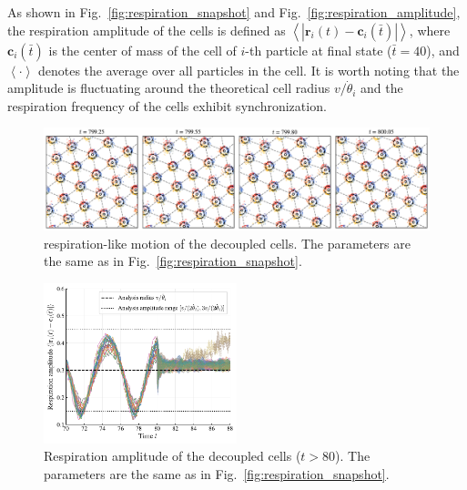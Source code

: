 \documentclass{article}
\begin{document}
As shown in Fig.~\ref{fig:respiration_snapshot} and Fig.~\ref{fig:respiration_amplitude}, the respiration amplitude of the cells is defined as $\left< \left| \mathbf{r}_i\left( t \right) -\mathbf{c}_i\left( \bar{t} \right) \right| \right> $, where $\mathbf{c}_i(\bar{t})$ is the center of mass of the cell of $i$-th particle at final state ($\bar{t}=40$), and $\left< \cdot \right>$ denotes the average over all particles in the cell. It is worth noting that the amplitude is fluctuating around the theoretical cell radius $v/\dot{\theta}_i$ and the
respiration frequency of the cells exhibit synchronization.

\begin{figure}[H]
    \centering
    \includegraphics[width=\textwidth]{./figs/respiration_snapshot_decoupled.pdf}
    \caption{
        respiration-like motion of the decoupled cells. The parameters are the same as in Fig.~\ref{fig:respiration_snapshot}.
    }
\end{figure}

\begin{figure}[H]
    \centering
    \includegraphics[width=0.5\textwidth]{./figs/respiration_amplitude_cells_decouled.pdf}
    \caption{
        Respiration amplitude of the decoupled cells ($t > 80$). The parameters are the same as in Fig.~\ref{fig:respiration_snapshot}.
    }
\end{figure}

\end{document}
